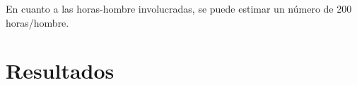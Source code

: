 En cuanto a las horas-hombre involucradas, se puede estimar un número de 200 horas/hombre. 



\section{Resultados}



